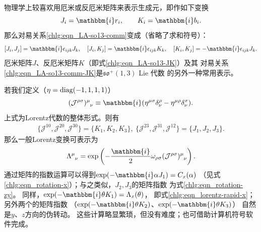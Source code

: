 物理学上较喜欢用厄米或反厄米矩阵来表示生成元，即作如下变换
\begin{equation}\label{chlg:eqn_LA-so13-JK}
    J_i = \mathbbm{i} r_i,\qquad  K_i = \mathbbm{i} b_i .
\end{equation}
那么对易关系\eqref{chlg:eqn_LA-so13-comm}变成（省略了求和符号）：
\begin{equation}\label{chlg:eqn_LA-so13-comm-JK}
    [J_i, J_j] = \mathbbm{i} \epsilon_{ijk} J_k,\quad
    [J_i, K_j] = \mathbbm{i} \epsilon_{ijk} K_k,\quad
    [K_i, K_j] = -\mathbbm{i}\epsilon_{ijk} J_k.
\end{equation}
厄米矩阵$J$、反厄米矩阵$K$（即式\eqref{chlg:eqn_LA-so13-JK}）及其
对易关系\eqref{chlg:eqn_LA-so13-comm-JK}是$\mathfrak{so}^{+}(1,3)$ Lie 代数
的另外一种常用表示。


若我们定义（$\eta={\rm diag}(-1,1,1,1)$）
\begin{equation}\label{chlg:eqn_LJw}
    (\mathcal{J}^{\rho\sigma})^\mu_{\hphantom{\mu}\nu} \equiv 
    \mathbbm{i} ( \eta^{\mu\sigma} \delta^\rho_\nu -\eta^{\mu\rho} \delta^\sigma_\nu).
\end{equation}
上式为Lorentz代数的整体形式。则有
\begin{align}
    \{\mathcal{J}^{10},\mathcal{J}^{20},\mathcal{J}^{30} \} =\{K_1,K_2,K_3\}, \
    \{\mathcal{J}^{23},\mathcal{J}^{31},\mathcal{J}^{12} \} =\{J_1,J_2,J_3\}.
\end{align}
那么一般Lorentz变换可表示为
\begin{equation}
    \Lambda^\mu_{\hphantom{\mu}\nu} = \exp\left( -\frac{\mathbbm{i}}{2}\omega_{\rho\sigma}
    (\mathcal{J}^{\rho\sigma})^\mu_{\hphantom{\mu}\nu} \right) .
\end{equation}
通过矩阵的指数运算可以得到$\exp(-\mathbbm{i} \alpha J_1)= C_x(\alpha)$
（见式\eqref{chlg:eqn_rotation-x}）；与之类似，$J_2,J_3$的矩阵指数
为式\eqref{chlg:eqn_rotation-zy}。
同样，$\exp(-\mathbbm{i} \theta K_1)= \Lambda_x(\theta)$，
即式\eqref{chlg:eqn_lorentz-rapid-x}；另外两个的矩阵指数
（$\exp(-\mathbbm{i} \theta K_2)$、$\exp(-\mathbbm{i} \theta K_3)$）
自然是$y$、$z$方向的伪转动。
这些计算略显繁琐，但没有难度；也可借助计算机符号软件完成。



